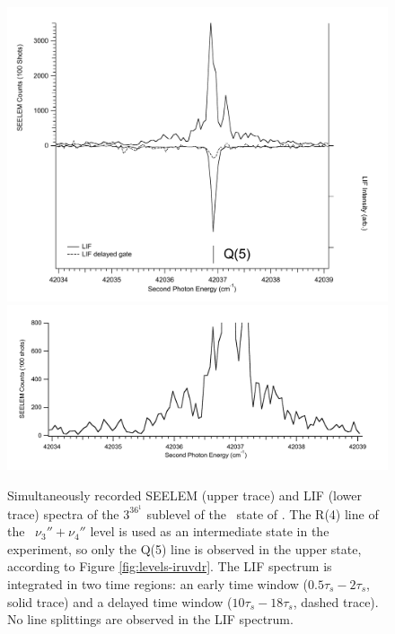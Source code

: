 \documentclass[12pt]{mitthesis}
\begin{document}
\begin{figure}
  \caption{Simultaneously recorded SEELEM (upper trace) and LIF (lower
    trace) spectra of the $3^36^1$  sublevel of the \astate\
    state of .  The R(4) line of the \xstate\ $\nu_3'' +
    \nu_4''$ level is used as an intermediate state in the experiment,
    so only the Q(5) line is observed in the upper state, according to
    Figure \ref{fig:levels-iruvdr}.  The LIF spectrum is integrated in
    two time regions: an early time window ($0.5\tau_s-2\tau_s$, solid
    trace) and a delayed time window ($10\tau_s-18\tau_s$, dashed
    trace).  No line splittings are observed in the LIF spectrum.}
  \label{fig:3361-q5}
  \centering
  \includegraphics[width=6in]{spectrum-3361-q5-split.pdf}
  \includegraphics[width=6in]{spectrum-3361-q5-zoom.pdf}
\end{figure}

\end{document}
